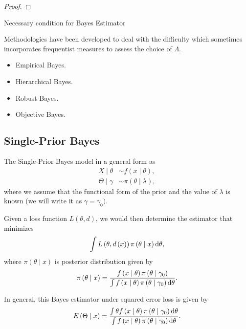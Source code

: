 \begin{proof}

\end{proof}

\begin{theorem}
	Necessary condition for Bayes Estimator
\end{theorem}

Methodologies have been developed to deal with the difficulty which sometimes incorporates frequentist measures to assess the choice of $\Lambda$.

\begin{itemize}
	\item Empirical Bayes.
	\item Hierarchical Bayes.
	\item Robust Bayes.
	\item Objective Bayes.
\end{itemize}

\subsection{Single-Prior Bayes}

The Single-Prior Bayes model in a general form as
\begin{equation}
	\begin{aligned}
		X\mid\theta      & \sim f\left(x\mid\theta\right),         \\
		\Theta\mid\gamma & \sim \pi\left(\theta\mid\lambda\right),
	\end{aligned}
	\label{eq:single-prior-bayes}
\end{equation}
where we assume that the functional form of the prior and the value of $\lambda$ is known (we will write it as $\gamma=\gamma_0)$.

Given a loss function $L\left(\theta,d\right)$, we would then determine the estimator that minimizes
\begin{equation}
	\int L\left(\theta,d\left(x\right)\right)\pi\left(\theta\mid x\right)\mathop{}\!\mathrm{d}\theta,
\end{equation}
where $\pi\left(\theta\mid x\right)$ is posterior distribution given by
\begin{equation*}
	\pi\left(\theta\mid x\right)=\frac{f\left(x\mid\theta\right)\pi\left(\theta\mid\gamma_0\right)}{\int f\left(x\mid\theta\right)\pi\left(\theta\mid\gamma_0\right)\mathop{}\!\mathrm{d}\theta}.
\end{equation*}

In general, this Bayes estimator under squared error loss is given by
\begin{equation}
	E\left(\Theta\mid x\right) = \frac{\int\theta f\left(x\mid\theta\right)\pi\left(\theta\mid\gamma_0\right)\mathop{}\!\mathrm{d}\theta}{\int f\left(x\mid\theta\right)\pi\left(\theta\mid\gamma_0\right)\mathop{}\!\mathrm{d}\theta}.
\end{equation}

